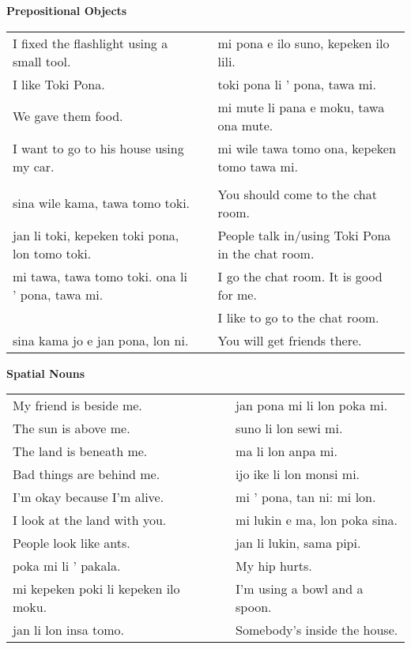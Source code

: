 \textbf{Prepositional Objects} 
\label{'prepositional_objects'}

\begin{supertabular}{p{5,5cm}|ll}
I fixed the flashlight using a small tool.  && mi pona e ilo suno, kepeken ilo lili. \\ %
I like Toki Pona.  && toki pona li ' pona, tawa mi. \\ %
We gave them food.  && mi mute li pana e moku, tawa ona mute. \\ %
I want to go to his house using my car.  && mi wile tawa tomo ona, kepeken tomo tawa mi. \\ %
&& \\ %
sina wile kama, tawa tomo toki.  && You should come to the chat room. \\
jan li toki, kepeken toki pona, lon tomo toki.  && People talk in/using Toki Pona in the chat room. \\
mi tawa, tawa tomo toki. ona li ' pona, tawa mi.  && I go the chat room. It is good for me. \\
                                         && I like to go to the chat room. \\ %
sina kama jo e jan pona, lon ni.  && You will get friends there. \\
\end{supertabular} 






\textbf{Spatial Nouns} 
\label{'other_prepositions'}

\begin{supertabular}{p{5,5cm}|ll}
My friend is beside me. && jan pona mi li lon poka mi. \\ %
The sun is above me. && suno li lon sewi mi. \\ %
The land is beneath me. && ma li lon anpa mi. \\ %
Bad things are behind me. && ijo ike li lon monsi mi. \\ %
I'm okay because I'm alive. && mi ' pona, tan ni: mi lon. \\ %
I look at the land with you.  && mi lukin e ma, lon poka sina. \\ %
People look like ants.  && jan li lukin, sama pipi. \\ %
poka mi li ' pakala.  && My hip hurts. \\
mi kepeken poki li kepeken ilo moku.  && I'm using a bowl and a spoon. \\
jan li lon insa tomo.  && Somebody's inside the house. \\
\end{supertabular} 

